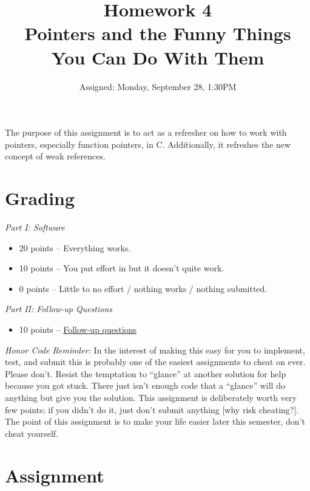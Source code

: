 \documentclass{article}
\begin{document}
\pagestyle{fancyplain}


\title{\textbf{Homework 4\\Pointers and the Funny Things You Can Do With Them}}
\author{Assigned: Monday, September 28, 1:30PM}
\date{\textbf{\color{red}{Due: Monday, October 5, 1:30PM (Hard Deadline)}}}
\maketitle

The purpose of this assignment is to act as a refresher on how to work with
pointers, especially function pointers, in C. Additionally, it refreshes the
new concept of weak references.


\section*{Grading}

\emph{Part I: Software}

\begin{itemize}
  \item 20 points -- Everything works.
  \item 10 points -- You put effort in but it doesn't quite work.
  \item 0 points -- Little to no effort / nothing works / nothing submitted.
\end{itemize}

\noindent
\emph{Part II: Follow-up Questions}

\begin{itemize}
  \item 10 points --
    \href{http://web.eecs.umich.edu/~prabal/teaching/eecs373/homeworks/373-F15-HW4-followup.pdf}{Follow-up questions}
\end{itemize}

\noindent
\textit{Honor Code Reminder:} In the interest of making this easy for you to
implement, test, and submit this is probably one of the easiest assignments to
cheat on ever. Please don't. Resist the temptation to ``glance'' at another
solution for help because you got stuck. There just isn't enough code that a
``glance'' will do anything but give you the solution. This assignment is
deliberately worth very few points; if you didn't do it, just don't submit
anything [why risk cheating?]. The point of this assignment is to make your
life easier later this semester, don't cheat yourself.


\section*{Assignment}
\end{document}
